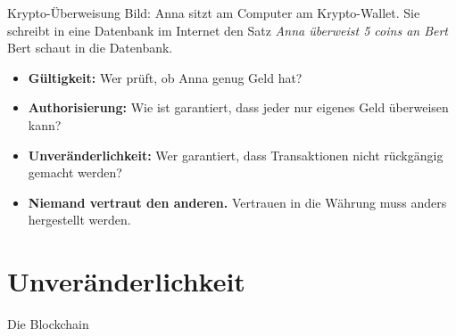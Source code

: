 \documentclass[aspectratio=169]{beamer}
\begin{document}
\begin{frame}{Krypto-Überweisung}
    Bild: Anna sitzt am Computer am Krypto-Wallet. Sie schreibt in eine Datenbank im Internet den Satz \emph{Anna überweist 5 coins an Bert} Bert schaut in die Datenbank.

    \pause
    \begin{itemize}
        \item \textbf{Gültigkeit:} Wer prüft, ob Anna genug Geld hat?
        \item \textbf{Authorisierung:} Wie ist garantiert, dass jeder nur eigenes Geld überweisen kann?
        \item \textbf{Unveränderlichkeit:} Wer garantiert, dass Transaktionen nicht rückgängig gemacht werden?
    \end{itemize}

    \vfill
    \begin{itemize}
        \item \textbf{Niemand vertraut den anderen.} Vertrauen in die Währung muss anders hergestellt werden.
    \end{itemize}
\end{frame}


\section{Unveränderlichkeit}

\begin{frame}[fragile]{Die Blockchain}
    \begin{center}
        \hspace{0.7cm}
        \hspace{0.7cm}
    \end{center}
\end{frame}
\end{document}

